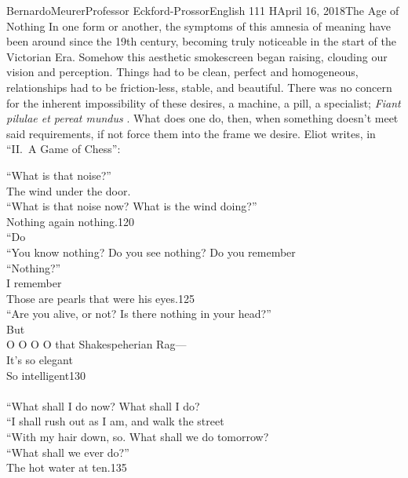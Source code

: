 \documentclass[12pt,letterpaper]{article}
\begin{document}
\begin{mla}{Bernardo}{Meurer}{Professor Eckford-Prossor}{English 111 H}{April 16, 2018}{The Age of Nothing}
    In one form or another, the symptoms of this amnesia of meaning have been around since the 19th century, becoming truly noticeable in the start of the Victorian Era. Somehow this aesthetic smokescreen began raising, clouding our vision and perception. Things had to be clean, perfect and homogeneous, relationships had to be friction-less, stable, and beautiful. There was no concern for the inherent impossibility of these desires, a machine, a pill, a specialist; \emph{Fiant pilulae et pereat mundus} \autocite[1]{schopenhauer_2009}. What does one do, then, when something doesn't meet said requirements, if not force them into the frame we desire. Eliot writes, in ``II.~A Game of Chess'':
    \begin{blocks}
        ``What is that noise?''\\
        \hspace{72pt}The wind under the door.\\
        ``What is that noise now? What is the wind doing?''\\
        \hspace{72pt}Nothing again nothing.\hfill 120\\
        \hspace{180pt}``Do\\
        ``You know nothing? Do you see nothing? Do you remember\\
        ``Nothing?''\\
        \hspace{20pt}I remember\\
        Those are pearls that were his eyes.\hfill 125\\
        ``Are you alive, or not? Is there nothing in your head?''\\
        \hspace{212pt}But\\
        O O O O that Shakespeherian Rag---\\
        It’s so elegant\\
        So intelligent\hfill 130\\~\\
        ``What shall I do now? What shall I do?\\
        ``I shall rush out as I am, and walk the street\\
        ``With my hair down, so. What shall we do tomorrow?\\
        ``What shall we ever do?''\\
        \hspace{67pt}The hot water at ten.\hfill 135\\

\end{blocks}
\end{mla}
\end{document}
